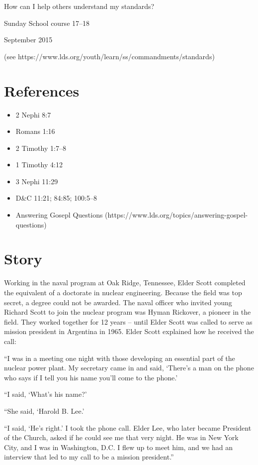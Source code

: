 \documentclass{article}
\begin{document}
\centerline{\sc \large How can I help others understand my standards?}
\vspace{.5pc}
\centerline{\sc Sunday School course 17--18}
\centerline{ September 2015}
\vspace{.5pc}
\centerline{\scriptsize (see https://www.lds.org/youth/learn/ss/commandments/standards)}
\vspace{6pc}

\section*{References}
\begin{itemize}
  \item 2 Nephi 8:7
  \item Romans 1:16
  \item 2 Timothy 1:7--8
  \item 1 Timothy 4:12
  \item 3 Nephi 11:29
  \item D\&C 11:21; 84:85; 100:5--8
  \item Answering Gosepl Questions (https://www.lds.org/topics/answering-gospel-questions)
\end{itemize}

\section*{Story}
Working in the naval program at Oak Ridge, Tennessee, Elder Scott completed the equivalent of a doctorate in nuclear engineering. Because the field was top secret, a degree could not be awarded. The naval officer who invited young Richard Scott to join the nuclear program was Hyman Rickover, a pioneer in the field. They worked together for 12 years -- until Elder Scott was called to serve as mission president in Argentina in 1965. Elder Scott explained how he received the call:

``I was in a meeting one night with those developing an essential part of the nuclear power plant. My secretary came in and said, `There's a man on the phone who says if I tell you his name you'll come to the phone.'

``I said, `What's his name?'

``She said, `Harold B. Lee.'

``I said, `He's right.' I took the phone call. Elder Lee, who later became President of the Church, asked if he could see me that very night. He was in New York City, and I was in Washington, D.C. I flew up to meet him, and we had an interview that led to my call to be a mission president.''
\end{document}
